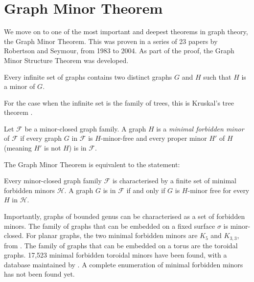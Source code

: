 \section{Graph Minor Theorem}\label{sec:Graph Minor Theorem}
We move on to one of the most important and deepest theorems in graph theory, the Graph Minor Theorem. This was proven in a series of 23 papers by Robertson and Seymour, from 1983 to 2004. As part of the proof, the Graph Minor Structure Theorem was developed. 
\begin{theorem}
	Every infinite set of graphs contains two distinct graphs \(G\) and \(H\) such that \(H\) is a minor of \(G\).
\end{theorem}
For the case when the infinite set is the family of trees, this is Kruskal's tree theorem \cite{kruskalWellQuasiOrderingTreeTheorem1960}. 


Let $\mathcal{F}$ be a minor-closed graph family. A graph $H$ is a \textit{minimal forbidden minor} of $\mathcal{F}$ if every graph $G$ in $\mathcal{F}$ is $H$-minor-free and every proper minor $H'$ of $H$ (meaning $H'$ is not $H$) is in $\mathcal{F}$. 

The Graph Minor Theorem is equivalent to the statement:
\begin{theorem}
	Every minor-closed graph family $\mathcal{F}$ is characterised by a finite set of minimal forbidden minors $\mathcal{H}$. A graph $G$ is in $\mathcal{F}$ if and only if $G$ is $H$-minor free for every $H$ in $\mathcal{H}$. 
\end{theorem}
Importantly, graphs of bounded genus can be characterised as a set of forbidden minors. The family of graphs that can be embedded on a fixed surface $\sigma$ is minor-closed. 
For planar graphs, the two minimal forbidden minors are \(K_5\) and \(K_{3,3}\), from \textcite{wagnerUeberEigenschaftEbenen1937}. 
The family of graphs that can be embedded on a torus are the toroidal graphs. 17,523 minimal forbidden toroidal minors have been found, with a database maintained by \textcite{myrvoldLargeSetTorus2018}. A complete enumeration of minimal forbidden minors has not been found yet. 

